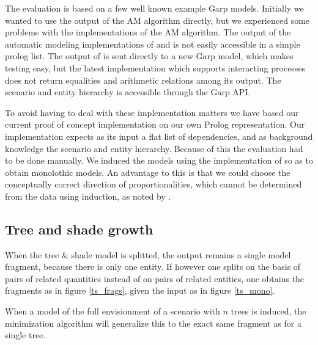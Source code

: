 \documentclass{article} %
\begin{document}
The evaluation is based on a few well known example Garp models. Initially
we wanted to use the output of the AM algorithm directly, but we experienced
some problems with the implementations of the AM algorithm.  The output of the
automatic modeling implementations of \cite{buisman} and
\cite{vanweelden} is not easily accessible in a simple prolog list. The output
of \cite{buisman} is sent directly to a new Garp model, which makes testing
easy, but the latest implementation \cite{vanweelden} which supports
interacting processes does not return equalities and arithmetic relations among
its output. The scenario and entity hierarchy is accessible through the Garp
API.

To avoid having to deal with these implementation matters we have based our
current proof of concept implementation on our own Prolog representation. Our
implementation expects as its input a flat list of dependencies, and as
background knowledge the scenario and entity hierarchy. Because of this the
evaluation had to be done manually. We induced the models using the
implementation of \cite{buisman} so as to obtain monolothic models. An
advantage to this is that we could choose the conceptually correct direction of
proportionalities, which cannot be determined from the data using induction, as
noted by \cite{vanweelden}.


\subsection{Tree and shade growth} 

When the tree \& shade model is splitted, the output remains a single model
fragment, because there is only one entity. If however one splits on the basis
of pairs of related quantities instead of on pairs of related entities, one
obtains the fragments as in figure \ref{ts_frags}, given the input as in figure
\ref{ts_mono}.

When a model of the full envisionment of a scenario with $n$ trees is induced,
the minimization algorithm will generalize this to the exact same fragment as
for a single tree.
\end{document}
